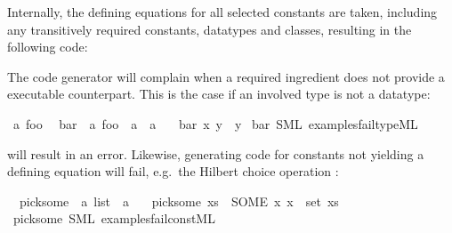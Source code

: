 \begin{isabellebody}
\begin{isamarkuptext}
  Internally, the defining equations for all selected
  constants are taken, including any transitively required
  constants, datatypes and classes, resulting in the following
  code:


  The code generator will complain when a required
  ingredient does not provide a executable counterpart.
  This is the case if an involved type is not a datatype:%
\end{isamarkuptext}%
\isamarkuptrue%
%
\isadelimML
%
\endisadelimML
%
\isatagML
%
\endisatagML
{\isafoldML}%
%
\isadelimML
\isanewline
%
\endisadelimML
{}\isamarkupfalse%
\ {\isacharprime}a\ foo\isanewline
\isanewline
{}\isamarkupfalse%
\isanewline
\ \ bar\ {\isacharcolon}{\isacharcolon}\ {\isachardoublequoteopen}{\isacharprime}a\ foo\ {\isasymRightarrow}\ {\isacharprime}a\ {\isasymRightarrow}\ {\isacharprime}a{\isachardoublequoteclose}\ \isanewline
\ \ {\isachardoublequoteopen}bar\ x\ y\ {\isacharequal}\ y{\isachardoublequoteclose}\isanewline
%
\isadelimML
%
\endisadelimML
%
\isatagML
%
\endisatagML
{\isafoldML}%
%
\isadelimML
%
\endisadelimML
\isanewline
{}\isamarkupfalse%
\ bar\ {\isacharparenleft}SML\ {\isachardoublequoteopen}examples{\isacharslash}fail{\isacharunderscore}type{\isachardot}ML{\isachardoublequoteclose}{\isacharparenright}%
\begin{isamarkuptext}%
\noindent will result in an error. Likewise, generating code
  for constants not yielding
  a defining equation will fail, e.g.~the Hilbert choice
  operation :%
\end{isamarkuptext}%
\isamarkuptrue%
%
\isadelimML
%
\endisadelimML
%
\isatagML
%
\endisatagML
{\isafoldML}%
%
\isadelimML
\isanewline
%
\endisadelimML
{}\isamarkupfalse%
\isanewline
\ \ pick{\isacharunderscore}some\ {\isacharcolon}{\isacharcolon}\ {\isachardoublequoteopen}{\isacharprime}a\ list\ {\isasymRightarrow}\ {\isacharprime}a{\isachardoublequoteclose}\ \isanewline
\ \ {\isachardoublequoteopen}pick{\isacharunderscore}some\ xs\ {\isacharequal}\ {\isacharparenleft}SOME\ x{\isachardot}\ x\ {\isasymin}\ set\ xs{\isacharparenright}{\isachardoublequoteclose}\isanewline
%
\isadelimML
%
\endisadelimML
%
\isatagML
%
\endisatagML
{\isafoldML}%
%
\isadelimML
%
\endisadelimML
\isanewline
{}\isamarkupfalse%
\ pick{\isacharunderscore}some\ {\isacharparenleft}SML\ {\isachardoublequoteopen}examples{\isacharslash}fail{\isacharunderscore}const{\isachardot}ML{\isachardoublequoteclose}{\isacharparenright}%

\end{isabellebody}
